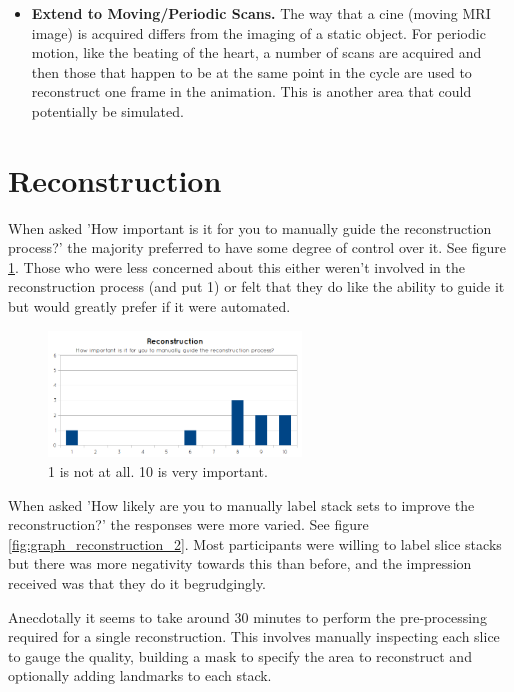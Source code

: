 \begin{itemize}
  \item \textbf{Extend to Moving/Periodic Scans.} The way that a cine (moving MRI image) is acquired differs from the imaging of a static object. For periodic motion, like the beating of the heart, a number of scans are acquired and then those that happen to be at the same point in the cycle are used to reconstruct one frame in the animation. This is another area that could potentially be simulated.
\end{itemize}


\newpage
\section{Reconstruction}
When asked 'How important is it for you to manually guide the reconstruction process?' the majority preferred to have some degree of control over it. See figure \ref{fig:graph_reconstruction_1}. Those who were less concerned about this either weren't involved in the reconstruction process (and put 1) or felt that they do like the ability to guide it but would greatly prefer if it were automated.

\begin{figure}[h]
    \centering
  \includegraphics[width=0.6\textwidth]{images/evaluation/graph_reconstruction_1.png}
    \caption{1 is not at all. 10 is very important.}\label{fig:graph_reconstruction_1}
\end{figure}

When asked 'How likely are you to manually label stack sets to improve the reconstruction?' the responses were more varied. See figure \ref{fig:graph_reconstruction_2}. Most participants were willing to label slice stacks but there was more negativity towards this than before, and the impression received was that they do it begrudgingly.

Anecdotally it seems to take around 30 minutes to perform the pre-processing required for a single reconstruction. This involves manually inspecting each slice to gauge the quality, building a mask to specify the area to reconstruct and optionally adding landmarks to each stack.

